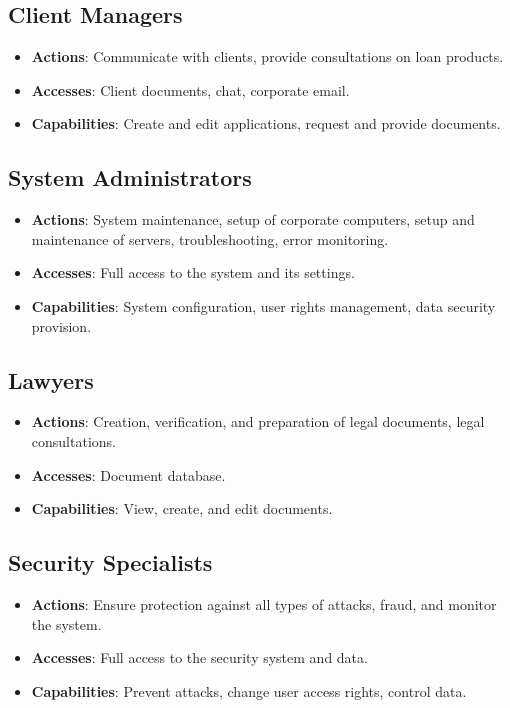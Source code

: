 \documentclass[20pt]{article}
\begin{document}
\subsection{Client Managers}
\begin{itemize}
    \item \textbf{Actions}: Communicate with clients, provide consultations on loan products.
    \item \textbf{Accesses}: Client documents, chat, corporate email.
    \item \textbf{Capabilities}: Create and edit applications, request and provide documents.
\end{itemize}

\subsection{System Administrators}
\begin{itemize}
    \item \textbf{Actions}: System maintenance, setup of corporate computers, setup and maintenance of servers, troubleshooting, error monitoring.
    \item \textbf{Accesses}: Full access to the system and its settings.
    \item \textbf{Capabilities}: System configuration, user rights management, data security provision.
\end{itemize}

\subsection{Lawyers}
\begin{itemize}
    \item \textbf{Actions}: Creation, verification, and preparation of legal documents, legal consultations.
    \item \textbf{Accesses}: Document database.
    \item \textbf{Capabilities}: View, create, and edit documents.
\end{itemize}

\subsection{Security Specialists}
\begin{itemize}
    \item \textbf{Actions}: Ensure protection against all types of attacks, fraud, and monitor the system.
    \item \textbf{Accesses}: Full access to the security system and data.
    \item \textbf{Capabilities}: Prevent attacks, change user access rights, control data.
\end{itemize}
\end{document}

